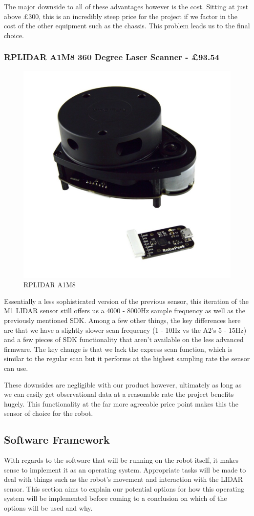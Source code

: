 					The major downside to all of these advantages however is the cost. Sitting at just above \pounds{300}, this is an incredibly steep price for the project if we factor in the cost of the other equipment such as the chassis. This problem leads us to the final choice.
					
					\subsubsection{RPLIDAR A1M8 360 Degree Laser Scanner - \pounds{93.54}}
					\begin{figure}[h]
						\centering
						\includegraphics[width=.3\linewidth]{ANALYSIS/rplidara1.jpg}
						\caption{RPLIDAR A1M8}
						\label{fig:rplidara1m8}
					\end{figure}
					Essentially a less sophisticated version of the previous sensor, this iteration of the M1 LIDAR sensor still offers us a 4000 - 8000Hz sample frequency as well as the previously mentioned SDK. Among a few other things, the key differences here are that we have a slightly slower scan frequency (1 - 10Hz vs the A2's 5 - 15Hz) and a few pieces of SDK functionality that aren't available on the less advanced firmware. The key change is that we lack the express scan function, which is similar to the regular scan but it performs at the highest sampling rate the sensor can use. 
					
					These downsides are negligible with our product however, ultimately as long as we can easily get observational data at a reasonable rate the project benefits hugely. This functionality at the far more agreeable price point makes this the sensor of choice for the robot.
				
				\subsection{Software Framework}
				With regards to the software that will be running on the robot itself, it makes sense to implement it as an operating system. Appropriate tasks will be made to deal with things such as the robot's movement and interaction with the LIDAR sensor. This section aims to explain our potential options for how this operating system will be implemented before coming to a conclusion on which of the options will be used and why.
				
